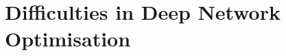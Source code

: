 \documentclass[handout,xcolor=pdftex,dvipsnames,table,mathserif]{beamer}
\begin{document}





\section{Difficulties in Deep Network Optimisation}

\end{document}
